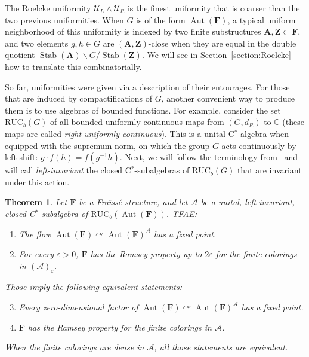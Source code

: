 \documentclass[11pt]{article}
\newtheorem{theo}{Theorem}[section]
\theoremstyle{definition}
\numberwithin{equation}{section}
\numberwithin{figure}{section}
\numberwithin{table}{section}
\newcommand{\A}{\mathcal A}
\newcommand{\CC}{\mathbb{C}}
\newcommand*{\mA}{\mathbf{A}}
\newcommand*{\mF}{\mathbf{F}}
\newcommand*{\mZ}{\mathbf{Z}}
\newcommand{\e}{\varepsilon}
\DeclareMathOperator{\Aut}{Aut}
\DeclareMathOperator{\Stab}{Stab}
\newcommand{\actson}{\curvearrowright}
\newcommand{\RUCB}{\mathrm{RUC}_{b}}
\begin{document}
The Roelcke uniformity $\mathcal U_{L}\wedge\mathcal U_{R}$ is the finest uniformity that is coarser than the two previous uniformities. When $G$ is of the form $\Aut(\mF)$, a typical uniform neighborhood of this uniformity is indexed by two finite substructures $\mA, \mZ \subset \mF$, and two elements $g,h\in G$ are $(\mA,\mZ)$-close when they are equal in the double quotient $\Stab(\mA)\backslash G / \Stab(\mZ)$. We will see in Section~\ref{section:Roelcke} how to translate this combinatorially.

So far, uniformities were given via a description of their entourages. For those that are induced by compactifications of $G$, another convenient way to produce them is to use algebras of bounded functions. For example, consider the set $\RUCB(G)$ of all bounded uniformly continuous maps from $(G,d_{R})$ to $\CC$ (these maps are called \emph{right-uniformly continuous}). This is a unital C$^{*}$-algebra when equipped with the supremum norm, on which the group $G$ acts continuously by left shift: $g\cdot f(h)=f(g^{-1}h)$. Next, we will follow the terminology from~\cite[Chapter~IV, Section~5]{dV} and will call \emph{left-invariant} the closed C$^{*}$-subalgebras of $\RUCB(G)$ that are invariant under this action.

\begin{theo}\label{thm:fpRPcpct}
Let $\mF$ be a Fra\"{\i}ss\'e structure, and let $\A$ be a unital, left-invariant, closed C$^{*}$-subalgebra of $\RUCB(\Aut(\mF))$. TFAE:
\begin{enumerate}
\item \label{3.1.1} The flow $\Aut(\mF)\actson \Aut(\mF)^{\A}$ has a fixed point.
\item \label{3.1.2} For every $\e>0$, $\mF$ has the Ramsey property up to $2\e$ for the finite colorings in $(\A)_{\e}$.
\end{enumerate}

Those imply the following equivalent statements:
\begin{enumerate}
\setcounter{enumi}{2}
\item \label{3.1.3} Every zero-dimensional factor of $\Aut(\mF)\actson \Aut(\mF)^{\A}$ has a fixed point.
\item \label{3.1.4} $\mF$ has the Ramsey property for the finite colorings in $\A$.
\end{enumerate}

When the finite colorings are dense in $\A$, all those statements are equivalent.
\end{theo}
\end{document}

